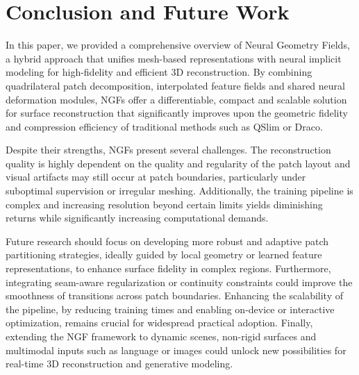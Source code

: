 \section{Conclusion and Future Work}\label{Sec:ConclusionAndFutureWork}

In this paper, we provided a comprehensive overview of Neural Geometry Fields, a hybrid approach that unifies mesh-based representations with neural implicit modeling for high-fidelity and efficient 3D reconstruction.
By combining quadrilateral patch decomposition, interpolated feature fields and shared neural deformation modules, NGFs offer a differentiable, compact and scalable solution for surface reconstruction that significantly improves upon the geometric fidelity and compression efficiency of traditional methods such as QSlim or Draco.

Despite their strengths, NGFs present several challenges.
The reconstruction quality is highly dependent on the quality and regularity of the patch layout and visual artifacts may still occur at patch boundaries, particularly under suboptimal supervision or irregular meshing.
Additionally, the training pipeline is complex and increasing resolution beyond certain limits yields diminishing returns while significantly increasing computational demands.

Future research should focus on developing more robust and adaptive patch partitioning strategies, ideally guided by local geometry or learned feature representations, to enhance surface fidelity in complex regions.
Furthermore, integrating seam-aware regularization or continuity constraints could improve the smoothness of transitions across patch boundaries.
Enhancing the scalability of the pipeline, by reducing training times and enabling on-device or interactive optimization, remains crucial for widespread practical adoption.
Finally, extending the NGF framework to dynamic scenes, non-rigid surfaces and multimodal inputs such as language or images could unlock new possibilities for real-time 3D reconstruction and generative modeling.
